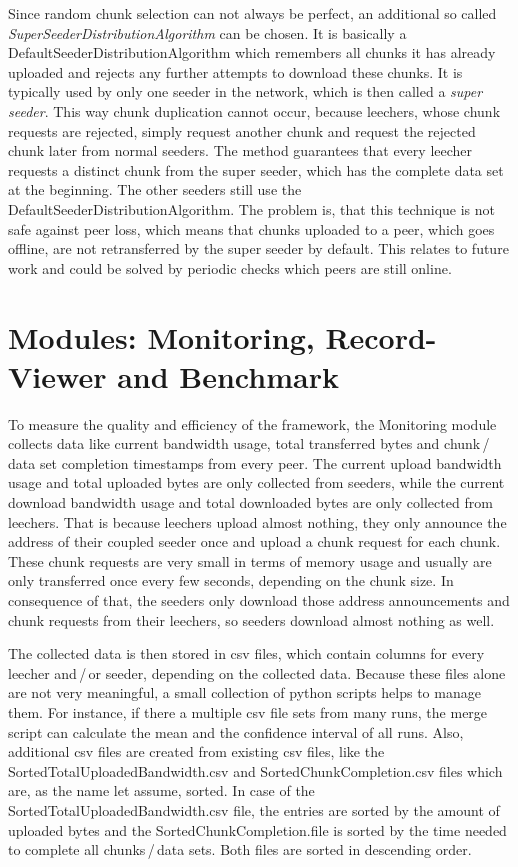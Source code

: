 Since random chunk selection can not always be perfect, an additional so called \emph{SuperSeederDistributionAlgorithm} can be chosen. It is basically a DefaultSeederDistributionAlgorithm which remembers all chunks it has already uploaded and rejects any further attempts to download these chunks. It is typically used by only one seeder in the network, which is then called a \emph{super seeder}. This way chunk duplication cannot occur, because leechers, whose chunk requests are rejected, simply request another chunk and request the rejected chunk later from normal seeders. The method guarantees that every leecher requests a distinct chunk from the super seeder, which has the complete data set at the beginning. The other seeders still use the DefaultSeederDistributionAlgorithm. The problem is, that this technique is not safe against peer loss, which means that chunks uploaded to a peer, which goes offline, are not retransferred by the super seeder by default. This relates to future work and could be solved by periodic checks which peers are still online.

\cleardoublepage
\chapter{Modules: Monitoring, Record-Viewer and Benchmark}
\label{ch:monitoring}
To measure the quality and efficiency of the framework, the Monitoring module collects data like current bandwidth usage, total transferred bytes and chunk\,/\,data set completion timestamps from every peer. The current upload bandwidth usage and total uploaded bytes are only collected from seeders, while the current download bandwidth usage and total downloaded bytes are only collected from leechers. That is because leechers upload almost nothing, they only announce the address of their coupled seeder once and upload a chunk request for each chunk. These chunk requests are very small in terms of memory usage and usually are only transferred once every few seconds, depending on the chunk size. In consequence of that, the seeders only download those address announcements and chunk requests from their leechers, so seeders download almost nothing as well.

The collected data is then stored in csv files, which contain columns for every leecher and\,/\,or seeder, depending on the collected data. Because these files alone are not very meaningful, a small collection of python scripts helps to manage them. For instance, if there a multiple csv file sets from many runs, the merge script can calculate the mean and the confidence interval of all runs. Also, additional csv files are created from existing csv files, like the SortedTotalUploadedBandwidth.csv and SortedChunkCompletion.csv files which are, as the name let assume, sorted. In case of the SortedTotalUploadedBandwidth.csv file, the entries are sorted by the amount of uploaded bytes and the SortedChunkCompletion.file is sorted by the time needed to complete all chunks\,/\,data sets. Both files are sorted in descending order.


